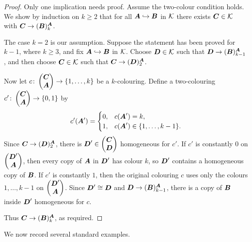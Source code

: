 \begin{proof}
    Only one implication needs proof. Assume the two-colour condition holds. We show by induction on \(k \geq 2\) that for all \(\boldsymbol{A}\hookrightarrow \boldsymbol{B}\) in \(\mathcal{K}\) there exists \(\boldsymbol{C} \in \mathcal{K}\) with \(\boldsymbol{C} \to (\boldsymbol{B})^{\boldsymbol{A}}_k\).

    The case \(k=2\) is our assumption. Suppose the statement has been proved for \(k-1\), where \(k \geq 3\), and fix \(\boldsymbol{A}\hookrightarrow \boldsymbol{B}\) in \(\mathcal{K}\). Choose \(\boldsymbol{D} \in \mathcal{K}\) such that \(\boldsymbol{D} \to (\boldsymbol{B})^{\boldsymbol{A}}_{k-1}\), and then choose \(\boldsymbol{C} \in \mathcal{K}\) such that \(\boldsymbol{C} \to (\boldsymbol{D})^{\boldsymbol{A}}_2\).

    Now let \(c \colon \begin{pmatrix} \boldsymbol{C} \\ \boldsymbol{A} \end{pmatrix} \to \{1,\dots,k\}\) be a \(k\)-colouring. Define a two-colouring \(c' \colon \begin{pmatrix} \boldsymbol{C} \\ \boldsymbol{A} \end{pmatrix} \to \{0,1\}\) by
    \[
        c'(\boldsymbol{A}')=
        \begin{cases}
            0, & c(\boldsymbol{A}')=k,                 \\
            1, & c(\boldsymbol{A}')\in\{1,\dots,k-1\}.
        \end{cases}
    \]
    Since \(\boldsymbol{C} \to (\boldsymbol{D})^{\boldsymbol{A}}_2\), there is \(\boldsymbol{D}' \in \begin{pmatrix} \boldsymbol{C} \\ \boldsymbol{D} \end{pmatrix}\) homogeneous for \(c'\). If \(c'\) is constantly \(0\) on \(\begin{pmatrix} \boldsymbol{D}' \\ \boldsymbol{A} \end{pmatrix}\), then every copy of \(\boldsymbol{A}\) in \(\boldsymbol{D}'\) has colour \(k\), so \(\boldsymbol{D}'\) contains a homogeneous copy of \(\boldsymbol{B}\). If \(c'\) is constantly \(1\), then the original colouring \(c\) uses only the colours \(1,\dots,k-1\) on \(\begin{pmatrix} \boldsymbol{D}' \\ \boldsymbol{A} \end{pmatrix}\). Since \(\boldsymbol{D}' \cong \boldsymbol{D}\) and \(\boldsymbol{D} \to (\boldsymbol{B})^{\boldsymbol{A}}_{k-1}\), there is a copy of \(\boldsymbol{B}\) inside \(\boldsymbol{D}'\) homogeneous for \(c\).

    Thus \(\boldsymbol{C} \to (\boldsymbol{B})^{\boldsymbol{A}}_k\), as required.
\end{proof}

We now record several standard examples.

